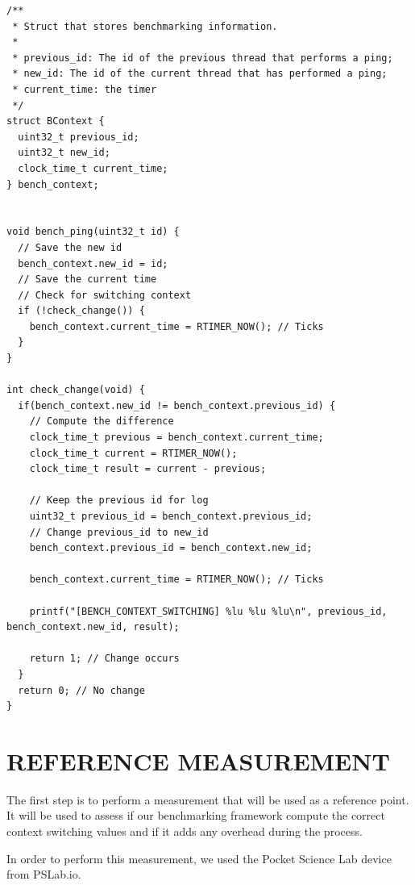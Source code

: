 \documentclass[a4paper, 10pt, conference]{ieeeconf}      %
\begin{document}
\begin{lstlisting}[style=CStyle, label={lst:code}, caption={Source code of the benchmarking framework implemented in Contiki}]
/**
 * Struct that stores benchmarking information.
 * 
 * previous_id: The id of the previous thread that performs a ping;
 * new_id: The id of the current thread that has performed a ping;
 * current_time: the timer
 */
struct BContext {
  uint32_t previous_id;
  uint32_t new_id;
  clock_time_t current_time;
} bench_context;


void bench_ping(uint32_t id) {
  // Save the new id
  bench_context.new_id = id;
  // Save the current time
  // Check for switching context
  if (!check_change()) {
    bench_context.current_time = RTIMER_NOW(); // Ticks
  }
}

int check_change(void) {
  if(bench_context.new_id != bench_context.previous_id) {
    // Compute the difference
    clock_time_t previous = bench_context.current_time;
    clock_time_t current = RTIMER_NOW();
    clock_time_t result = current - previous;

    // Keep the previous id for log
    uint32_t previous_id = bench_context.previous_id;
    // Change previous_id to new_id
    bench_context.previous_id = bench_context.new_id;

    bench_context.current_time = RTIMER_NOW(); // Ticks

    printf("[BENCH_CONTEXT_SWITCHING] %lu %lu %lu\n", previous_id, bench_context.new_id, result);
    
    return 1; // Change occurs
  }
  return 0; // No change
}
\end{lstlisting}

\section{\label{sec:ref}REFERENCE MEASUREMENT}
The first step is to perform a measurement that will be used as a reference point.
It will be used to assess if our benchmarking framework compute the correct context switching values and if it adds any overhead during the process.

In order to perform this measurement, we used the Pocket Science Lab device from PSLab.io.
\end{document}
